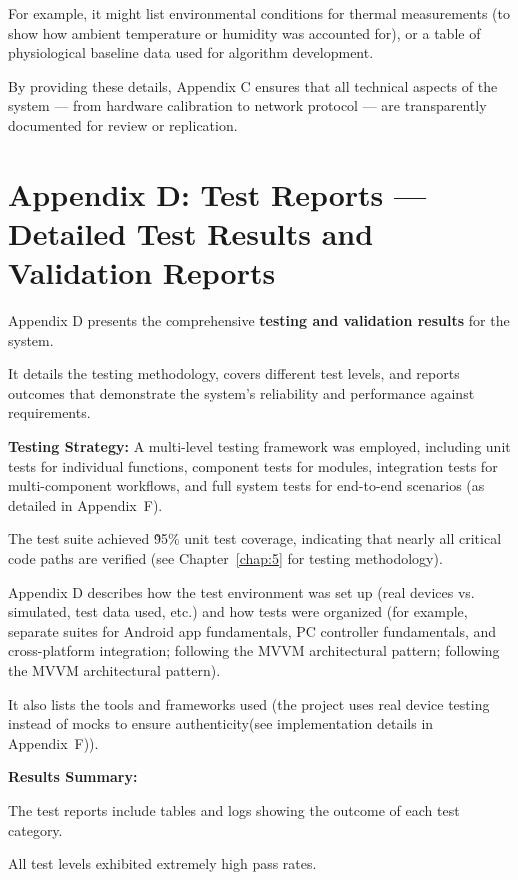 For example, it might list environmental conditions for thermal measurements (to show how ambient temperature or humidity was accounted for), or a table of physiological baseline data used for algorithm development.

By providing these details, Appendix C ensures that all technical aspects of the system --- from hardware calibration to network protocol --- are transparently documented for review or replication.

\section{Appendix D: Test Reports --- Detailed Test Results and Validation Reports}

Appendix D presents the comprehensive \textbf{testing and validation results}
 for the system.

It details the testing methodology, covers different test levels, and reports outcomes that demonstrate the system's reliability and performance against requirements.

\textbf{Testing Strategy:}
 A multi-level testing framework was employed, including unit tests for individual functions, component tests for modules, integration tests for multi-component workflows, and full system tests for end-to-end scenarios (as detailed in Appendix~F).

The test suite achieved \~95\% unit test coverage, indicating that nearly all critical code paths are verified (see Chapter~\ref{chap:5} for testing methodology).

Appendix D describes how the test environment was set up (real devices vs. simulated, test data used, etc.) and how tests were organized (for example, separate suites for Android app fundamentals, PC controller fundamentals, and cross-platform integration; following the MVVM architectural pattern; following the MVVM architectural pattern).

It also lists the tools and frameworks used (the project uses real device testing instead of mocks to ensure authenticity(see implementation details in Appendix~F)).

\textbf{Results Summary:}

The test reports include tables and logs showing the outcome of each test category.

All test levels exhibited extremely high pass rates.

